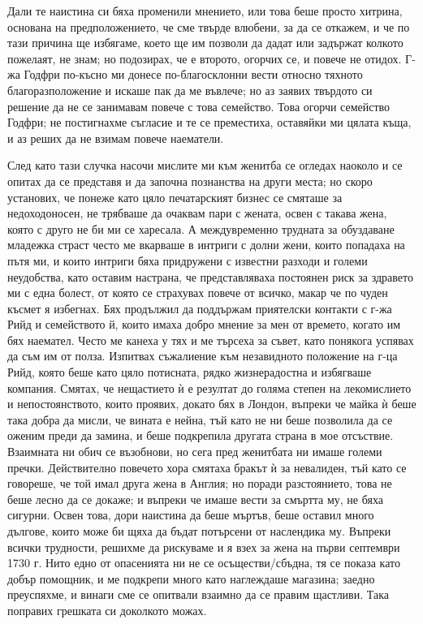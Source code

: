 \documentclass[12pt]{book}
\begin{document}
Дали те наистина си бяха променили мнението, или това беше просто хитрина, основана на предположението, че сме твърде влюбени, за да се откажем, и че по тази причина ще избягаме, което ще им позволи да дадат или задържат колкото пожелаят, не знам; но подозирах, че е второто, огорчих се, и повече не отидох. Г-жа Годфри по-късно ми донесе по-благосклонни вести относно тяхното благоразположение и искаше пак да ме въвлече; но аз заявих твърдото си решение да не се занимавам повече с това семейство. Това огорчи семейство Годфри; не постигнахме съгласие и те се преместиха, оставяйки ми цялата къща, и аз реших да не взимам повече наематели.

След като тази случка насочи мислите ми към женитба се огледах наоколо и се опитах да се представя и да започна познанства на други места; но скоро установих, че понеже като цяло печатарският бизнес се смяташе за недоходоносен, не трябваше да очаквам пари с жената, освен с такава жена, която с друго не би ми се харесала. А междувременно трудната за обуздаване младежка страст често ме вкарваше в интриги с долни жени, които попадаха на пътя ми, и които интриги бяха придружени с известни разходи и големи неудобства, като оставим настрана, че представляваха постоянен риск за здравето ми с една болест, от която се страхувах повече от всичко, макар че по чуден късмет я избегнах. Бях продължил да поддържам приятелски контакти с г-жа Рийд и семейството й, които имаха добро мнение за мен от времето, когато им бях наемател. Често ме канеха у тях и ме търсеха за съвет, като понякога успявах да съм им от полза. Изпитвах съжалиение към незавидното положение на г-ца Рийд, която беше като цяло потисната, рядко жизнерадостна и избягваше компания. Смятах, че нещастието ѝ е резултат до голяма степен на лекомислието и непостоянството, които проявих, докато бях в Лондон, въпреки че майка ѝ беше така добра да мисли, че вината е нейна, тъй като не ни беше позволила да се оженим преди да замина, и беше подкрепила другата страна в мое отсъствие. Взаимната ни обич се възобнови, но сега пред женитбата ни имаше големи пречки. Действително повечето хора смятаха бракът ѝ за невалиден, тъй като се говореше, че той имал друга жена в Англия; но поради разстоянието, това не беше лесно да се докаже; и въпреки че имаше вести за смъртта му, не бяха сигурни. Освен това, дори наистина да беше мъртъв, беше оставил много дългове, които може би щяха да бъдат потърсени от наслендика му. Въпреки всички трудности, решихме да рискуваме и я взех за жена на първи септември 1730 г. Нито едно от опасенията ни не се осъществи/сбъдна, тя се показа като добър помощник, и ме подкрепи много като наглеждаше магазина; заедно преуспяхме, и винаги сме се опитвали взаимно да се правим щастливи. Така поправих грешката си доколкото можах. 
\end{document}
